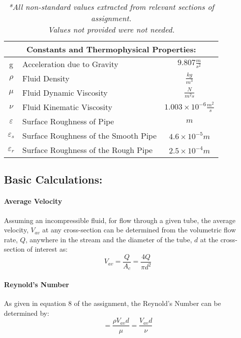 \documentclass[12pt]{article}
\begin{document}
	\hfill\break\break
	\begin{table}
		\centering
		{
		\begin{tabular}{|c|l|c|}
		\hline
			\multicolumn{3}{|c|}{\textbf{Constants and Thermophysical Properties:}} \\
		\hline
		\hline
			g & Acceleration due to Gravity & $9.807\frac{m}{s^2}$\\
			$\rho$ & Fluid Density & $\frac{kg}{m^3}$\\
			$\mu$ & Fluid Dynamic Viscosity & $\frac{N}{m^2s}$\\
			$\nu$ & Fluid Kinematic Viscosity & $1.003\times10^{-6}\frac{m^2}{s}$\\
			$\varepsilon$ & Surface Roughness of Pipe & $m$ \\
			$\varepsilon_s$ & Surface Roughness of the Smooth Pipe & $4.6\times 10^{-5} m$ \\
			$\varepsilon_r$ & Surface Roughness of the Rough Pipe & $2.5\times 10^{-4} m$ \\
		\hline
		\end{tabular}
		}
		\caption*{\textit{*All non-standard values extracted from relevant sections of assignment. \\ Values not provided were not needed.}}
	\end{table}


	\subsection{Basic Calculations:}
	\paragraph{Average Velocity}
		Assuming an incompressible fluid, for flow through a given tube, the average velocity, $V_{av}$ at any cross-section can be determined from the volumetric flow rate, $Q$, anywhere in the stream and the diameter of the tube, $d$ at the cross-section of interest as:
		\begin{equation}
			V_{av} = \frac{Q}{A_{c}} = \frac{4Q}{\pi d^2}
		\end{equation}
		
	\paragraph{Reynold's Number}
	As given in equation 8 of the assignment, the Reynold's Number can be determined by:
	\begin{equation}
		[Re] = \frac{\rho V_{av}d}{\mu} = \frac{V_{av}d}{\nu}
	\end{equation}
	
\end{document}
